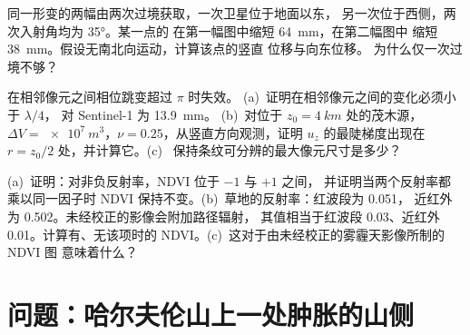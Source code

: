 \begin{exercise}[$\star\star\star$]\label{exo:b3:remote-sensing-gis:10}
同一形变的两幅由两次过境获取，一次卫星位于地面以东，
另一次位于西侧，两次入射角均为 \ang{35}。某一点的
在第一幅图中缩短 \qty{64}{mm}，在第二幅图中
缩短 \qty{38}{mm}。假设无南北向运动，计算该点的竖直
位移与向东位移。
为什么仅一次过境不够？
\end{exercise}

\begin{exercise}[$\star\star\star$]\label{exo:b3:remote-sensing-gis:11}
在相邻像元之间相位跳变超过 $\pi$ 时失效。
(a)~证明在相邻像元之间的变化必须小于 $\lambda/4$，
对 Sentinel-1 为 \qty{13.9}{mm}。
(b)~对位于 $z_0 = \qty{4}{km}$ 处的茂木源，$\Delta V =
\qty{e7}{m^3}$，$\nu = 0.25$，从竖直方向观测，证明
$u_z$ 的最陡梯度出现在 $r = z_0/2$ 处，并计算它。(c)~
保持条纹可分辨的最大像元尺寸是多少？
\end{exercise}

\begin{exercise}[$\star\star\star$]\label{exo:b3:remote-sensing-gis:12}
(a)~证明：对非负反射率，NDVI 位于 $-1$ 与 $+1$ 之间，
并证明当两个反射率都
乘以同一因子时 NDVI 保持不变。(b)~草地的反射率：红波段为 0.051，
近红外为 0.502。未经校正的影像会附加路径辐射，
其值相当于红波段 0.03、近红外 0.01。计算有、无该项时的
NDVI。(c)~这对于由未经校正的雾霾天影像所制的 NDVI 图
意味着什么？
\end{exercise}

\section{问题：哈尔夫伦山上一处肿胀的山侧}

